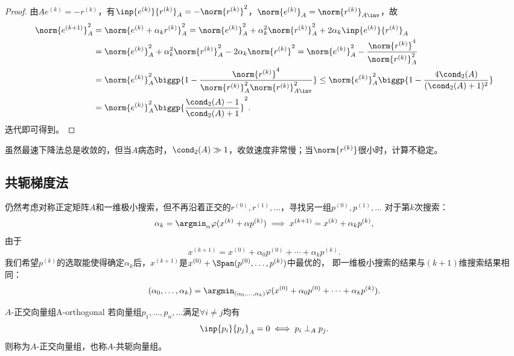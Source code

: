 \begin{proof}
    由$Ae^{(k)}=-r^{(k)}$，有$\inp{e^{(k)}}{r^{(k)}}_A=-\norm{r^{(k)}}^2$，$\norm{e^{(k)}}_A=\norm{r^{(k)}}_{A\inv}$，故
    \begin{align*}
        \norm{e^{(k+1)}}_A^2&=\norm{e^{(k)}+\alpha_kr^{(k)}}_A^2
        =\norm{e^{(k)}}_A^2+\alpha_k^2\norm{r^{(k)}}_A^2+2\alpha_k\inp{e^{(k)}}{r^{(k)}}_A\\
        &=\norm{e^{(k)}}_A^2+\alpha_k^2\norm{r^{(k)}}_A^2-2\alpha_k\norm{r^{(k)}}^2=
        \norm{e^{(k)}}_A^2-\frac{\norm{r^{(k)}}^4}{\norm{r^{(k)}}_A^2}\\
        &=\norm{e^{(k)}}_A^2\biggp{1-\frac{\norm{r^{(k)}}^4}{\norm{r^{(k)}}_A^2\norm{r^{(k)}}_{A\inv}^2}}\leq\norm{e^{(k)}}_A^2\biggp{1-\frac{4\cond_2(A)}{(\cond_2(A)+1)^2}}\\
        &=\norm{e^{(k)}}_A^2\biggp{\frac{\cond_2(A)-1}{\cond_2(A)+1}}^2.
    \end{align*}
    迭代即可得到。
\end{proof}

\begin{remark}
    虽然最速下降法总是收敛的，但当$A$病态时，$\cond_2(A)\gg 1$，收敛速度非常慢；当$\norm{r^{(k)}}$很小时，计算不稳定。
\end{remark}

\subsection{共轭梯度法}
\label{ssec:conjugate gradient method}

仍然考虑对称正定矩阵$A$和一维极小搜索，但不再沿着正交的$r^{(0)},r^{(1)},\ldots$，寻找另一组$p^{(0)},p^{(1)},\ldots$
对于第$k$次搜索：
\[
    \alpha_k=\argmin_\alpha\varphi(x^{(k)}+\alpha p^{(k)})\implies
    x^{(k+1)}=x^{(k)}+\alpha_kp^{(k)},
\]
由于
\[
    x^{(k+1)}=x^{(0)}+\alpha_0p^{(0)}+\cdots+\alpha_kp^{(k)}.
\]
我们希望$p^{(k)}$的选取能使得确定$\alpha_k$后，$x^{(k+1)}$是$x^{(0)}+\Span(p^{(0)},\ldots,p^{(k)})$中最优的，
即一维极小搜索的结果与$(k+1)$维搜索结果相同：
\[
    (\alpha_0,\ldots,\alpha_k)=\argmin_{(\alpha_0,\ldots,\alpha_k)}\varphi(x^{(0)}+\alpha_0p^{(0)}+\cdots+\alpha_kp^{(k)}).
\]

\begin{definition}
    {$A$-正交向量组}{A-orthogonal}
    若向量组$p_1,\ldots,p_n,\ldots$满足$\forall i\neq j$均有
    \begin{equation}
        \inp{p_i}{p_j}_A=0\iff p_i\perp_A p_j.
    \end{equation}
    则称为$A$-正交向量组，也称$A$-共轭向量组。
\end{definition}


